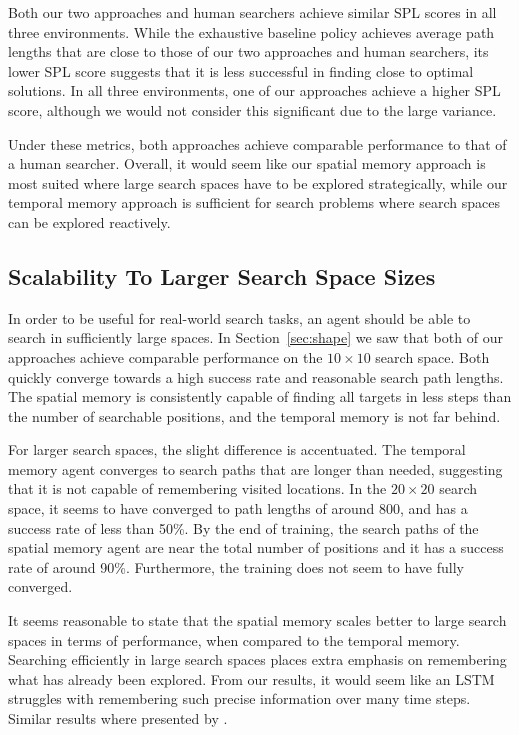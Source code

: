 Both our two approaches and human searchers achieve similar SPL scores in all three environments.
While the exhaustive baseline policy achieves average path lengths that are close to those of our two approaches and human searchers, its lower SPL score suggests that it is less successful in finding close to optimal solutions.
In all three environments, one of our approaches achieve a higher SPL score,
although we would not consider this significant due to the large variance.

Under these metrics, both approaches achieve comparable performance to that of a human searcher. 
Overall, it would seem like our spatial memory approach is most suited where large search spaces have to be explored strategically, while our temporal memory approach is sufficient for search problems where search spaces can be explored reactively.

\subsection{Scalability To Larger Search Space Sizes}

In order to be useful for real-world search tasks, an agent should be able to search in sufficiently large spaces.
In Section~\ref{sec:shape} we saw that both of our approaches achieve comparable performance on the \(10 \times 10\) search space.
Both quickly converge towards a high success rate and reasonable search path lengths.
The spatial memory is consistently capable of finding all targets in less steps than the number of searchable positions, and the temporal memory is not far behind.

For larger search spaces, the slight difference is accentuated.
The temporal memory agent converges to search paths that are longer than needed, suggesting that it is not capable of remembering visited locations.
In the \(20 \times 20\) search space, it seems to have converged to path lengths of around 800, and has a success rate of less than 50\%.
By the end of training, the search paths of the spatial memory agent are near the total number of positions and it has a success rate of around 90\%.
Furthermore, the training does not seem to have fully converged.

It seems reasonable to state that the spatial memory scales better to large search spaces in terms of performance, when compared to the temporal memory.
Searching efficiently in large search spaces places extra emphasis on remembering what has already been explored.
From our results, it would seem like an LSTM struggles with remembering such precise information over many time steps.
Similar results where presented by \cite{oh_control_2016}.

